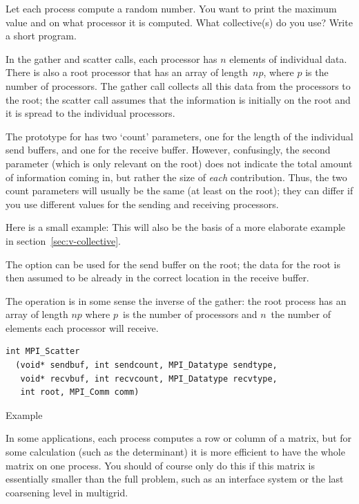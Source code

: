 \begin{exercise}
  \label{ex:randomwhere}
  Let each process compute a random number.
  You want to print the maximum value and on what processor it
  is computed. What collective(s) do you use? Write a short program.
\end{exercise}

In the gather and scatter calls, each processor has $n$ elements of individual
data. There is also a root processor that has an array of length~$np$, where $p$
is the number of processors. The gather call collects all this data from the 
processors to the root; the scatter call assumes that the information is 
initially on the root and it is spread to the individual processors.

The prototype for  has two `count' parameters, one
for the length of the individual send buffers, and one for the receive buffer.
However, confusingly, the second parameter (which is only relevant on the root)
does not indicate the total amount of information coming in, but
rather the size of \emph{each} contribution. Thus, the two count parameters
will usually be the same (at least on the root); they can differ if you 
use different  values for the sending and receiving
processors.


Here is a small example:
This will also be the basis of a more elaborate example in
section~\ref{sec:v-collective}.

The  option can be used for the send buffer on the root;
the data for the root is then assumed to be already in the correct location
in the receive buffer.

The  operation is in some sense the inverse of the gather:
the root process has an array of length $np$ where $p$~is the number of processors
and $n$~the number of elements each processor will receive.
\begin{lstlisting}
int MPI_Scatter
  (void* sendbuf, int sendcount, MPI_Datatype sendtype, 
   void* recvbuf, int recvcount, MPI_Datatype recvtype, 
   int root, MPI_Comm comm) 
\end{lstlisting}

 {Example}

In some applications, each process computes a row or column of a
matrix, but for some calculation (such as the determinant) it is more
efficient to have the whole matrix on one process. You should of
course only do this if this matrix is essentially smaller than the
full problem, such as an interface system or the last coarsening level
in multigrid.

